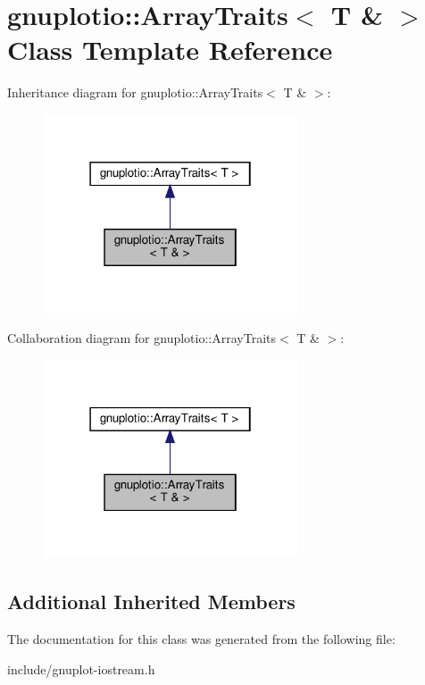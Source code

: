 \hypertarget{classgnuplotio_1_1ArrayTraits_3_01T_01_6_01_4}{}\section{gnuplotio\+:\+:Array\+Traits$<$ T \& $>$ Class Template Reference}
\label{classgnuplotio_1_1ArrayTraits_3_01T_01_6_01_4}


Inheritance diagram for gnuplotio\+:\+:Array\+Traits$<$ T \& $>$\+:\nopagebreak
\begin{figure}[H]
\begin{center}
\leavevmode
\includegraphics[width=214pt]{classgnuplotio_1_1ArrayTraits_3_01T_01_6_01_4__inherit__graph}
\end{center}
\end{figure}


Collaboration diagram for gnuplotio\+:\+:Array\+Traits$<$ T \& $>$\+:\nopagebreak
\begin{figure}[H]
\begin{center}
\leavevmode
\includegraphics[width=214pt]{classgnuplotio_1_1ArrayTraits_3_01T_01_6_01_4__coll__graph}
\end{center}
\end{figure}
\subsection*{Additional Inherited Members}


The documentation for this class was generated from the following file\+:\begin{DoxyCompactItemize}
\item 
include/gnuplot-\/iostream.\+h\end{DoxyCompactItemize}
